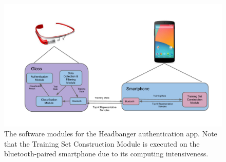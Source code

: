 \begin{figure}[t]
\centering
\includegraphics [width=.85\linewidth]{../fig/sofware_architecture}
\caption{The software modules for the Headbanger authentication app. Note that 
the Training Set Construction Module is executed on the bluetooth-paired 
smartphone due to its computing intensiveness. \label{fig:software_arch}}
\end{figure}

\fi
